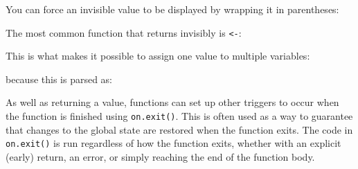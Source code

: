 You can force an invisible value to be displayed by wrapping it in
parentheses:

\begin{Shaded}
\begin{Highlighting}[]
\NormalTok{(}\NormalTok{())}
\end{Highlighting}
\end{Shaded}

The most common function that returns invisibly is
\texttt{\textless{}-}: 

\begin{Shaded}
\begin{Highlighting}[]
\StringTok{ }
\StringTok{ }\NormalTok{)}
\end{Highlighting}
\end{Shaded}

This is what makes it possible to assign one value to multiple
variables:

\begin{Shaded}
\begin{Highlighting}[]
\StringTok{ }\StringTok{ }\StringTok{ }\StringTok{ }
\end{Highlighting}
\end{Shaded}

because this is parsed as:

\begin{Shaded}
\begin{Highlighting}[]
\StringTok{ }\StringTok{ }\StringTok{ }\StringTok{ }\NormalTok{))))}
\end{Highlighting}
\end{Shaded}


As well as returning a value, functions can set up other triggers to
occur when the function is finished using \texttt{on.exit()}. This is
often used as a way to guarantee that changes to the global state are
restored when the function exits. The code in \texttt{on.exit()} is run
regardless of how the function exits, whether with an explicit (early)
return, an error, or simply reaching the end of the function body.

